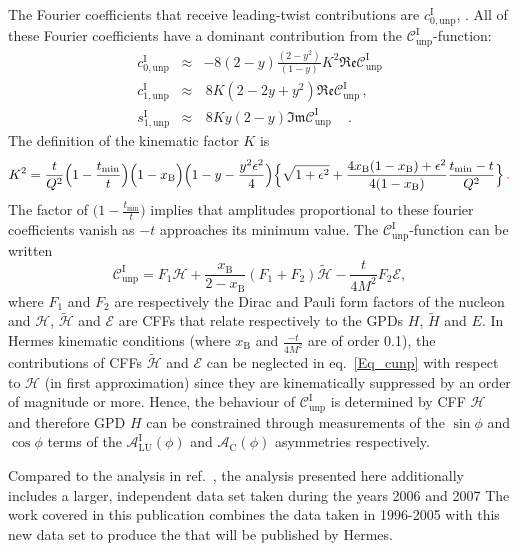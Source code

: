 The Fourier coefficients that receive leading-twist contributions are $c_{0,\textrm{unp}}^{\textrm{I}}$, . All of these Fourier coefficients have a dominant contribution from the $\mathcal{C}_{\textrm{unp}}^{\textrm{I}}$-function:
\begin{eqnarray}
c_{0,\textrm{unp}}^{\textrm{I}} &\approx&-8(2-y)\frac{(2-y^2)}{(1-y)}K^2\mathfrak{Re}\mathcal{C}_{\textrm{unp}}^{\textrm{I}}\label{eq:c0}
\\
c_{1,\textrm{unp}}^{\textrm{I}} &\approx&\,8K(2- 2y + y^{2})\mathfrak{Re}\mathcal{C}_{\textrm{unp}}^{\textrm{I}}\,,\label{eq:c1}
\\
s_{1,\textrm{unp}}^{\textrm{I}} &\approx&\,8Ky(2-y)\mathfrak{Im}\mathcal{C}_{\textrm{unp}}^{\textrm{I}}\quad\,. \label{eq:s1}
\end{eqnarray}
The definition of the kinematic factor $K$ is~\cite{Bel02b}\red{:}
\begin{equation}
K^2=\frac{t}{Q^2}\Big(1-\frac{t_{\textrm{min}}}{t}\Big)\Big(1-x_{\textrm{B}}\Big)\Big(1-y-\frac{y^2\epsilon^2}{4}\Big)\Big\lbrace\sqrt{1+\epsilon^2}+\frac{4x_{\textrm{B}}(1-x_{\textrm{B}})+\epsilon^2}{4(1-x_{\textrm{B}})}
\frac{t_{\textrm{min}}-t}{Q^2}\Big\rbrace{\color{red}{\,.}\color{black}}\label{eq:K}
\end{equation} 
The factor of $\Big(1-\frac{t_{\textrm{min}}}{t}\Big)$ implies that amplitudes proportional to these fourier coefficients vanish as $-t$ approaches its minimum value.
The $\mathcal{C}_{\textrm{unp}}^{\textrm{I}}$-function can be
written
\cite{Bel02b} 
\begin{equation}
 \mathcal{C}_{\textrm{unp}}^{\textrm{I}} = F_{1}\mathcal{H} + \frac{x_{\textrm{B}}}{2-x_{\textrm{B}}}(F_{1}+F_{2})\widetilde{\mathcal{H}} -\frac{t}{4M^{2}}F_{2}\mathcal{E},
\label{Eq_cunp}
\end{equation}
where $F_{1}$ and $F_{2}$ are respectively the Dirac and Pauli form
factors of the nucleon and $\mathcal{H}$, $\widetilde{\mathcal{H}}$ and
$\mathcal{E}$ are CFFs that relate respectively to the GPDs $H$,
$\widetilde{H}$ and $E$.  In H{\sc ermes} kinematic
conditions (where $x_{\textrm{B}}$ and $\frac{-t}{4M^2}$ are of order 0.1), the
contributions of CFFs $\widetilde{\mathcal{H}}$ and $\mathcal{E}$ can be
neglected in eq.~\ref{Eq_cunp} with respect to $\mathcal{H}$ (in first approximation) since they
are kinematically suppressed by an order of magnitude or more.
Hence, the behaviour of
$\mathcal{C}_{\textrm{unp}}^{\textrm{I}}$ is determined by CFF $\mathcal{H}$
and therefore GPD $H$ can be constrained through
measurements of the $\sin\phi$ and $\cos\phi$ terms of the $\mathcal{A}^{\textrm{I}}_{\textrm{LU}}(\phi)$ and $\mathcal{A}_{\textrm{C}}(\phi)$ asymmetries respectively.

Compared to the analysis in ref.~\cite{Air09}, the analysis presented here additionally includes a larger, independent data set taken during the years 2006 and 2007  The work covered in this publication  combines the data taken in 1996-2005 with this new data set to produce the  that will be published by H{\sc ermes}.
